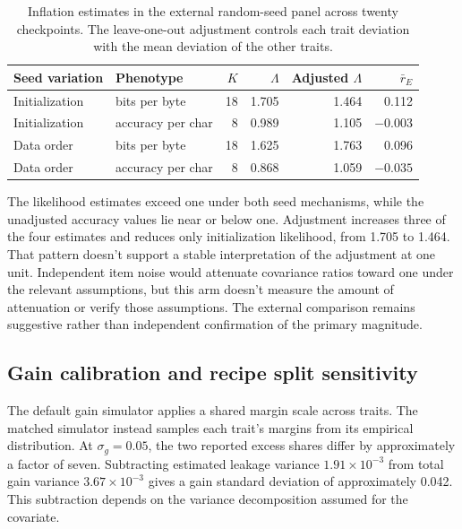 \begin{table}[htbp]
\centering\small
\caption{Inflation estimates in the external random-seed panel across twenty checkpoints. The leave-one-out adjustment controls each trait deviation with the mean deviation of the other traits.}
\label{tab:original12}
\begin{tabular}{llrrrr}\hline
Seed variation & Phenotype & $K$ & $\Lambda$ & Adjusted $\Lambda$ & $\bar r_E$\\\hline
Initialization & bits per byte & 18 & 1.705 & 1.464 & 0.112\\
Initialization & accuracy per char & 8 & 0.989 & 1.105 & $-0.003$\\
Data order & bits per byte & 18 & 1.625 & 1.763 & 0.096\\
Data order & accuracy per char & 8 & 0.868 & 1.059 & $-0.035$\\\hline
\end{tabular}
\end{table}

The likelihood estimates exceed one under both seed mechanisms, while the unadjusted accuracy values lie near or below one. Adjustment increases three of the four estimates and reduces only initialization likelihood, from 1.705 to 1.464. That pattern doesn't support a stable interpretation of the adjustment at one unit. Independent item noise would attenuate covariance ratios toward one under the relevant assumptions, but this arm doesn't measure the amount of attenuation or verify those assumptions. The external comparison remains suggestive rather than independent confirmation of the primary magnitude.

\subsection{Gain calibration and recipe split sensitivity}
The default gain simulator applies a shared margin scale across traits. The matched simulator instead samples each trait's margins from its empirical distribution. At $\sigma_g=0.05$, the two reported excess shares differ by approximately a factor of seven. Subtracting estimated leakage variance $1.91\times10^{-3}$ from total gain variance $3.67\times10^{-3}$ gives a gain standard deviation of approximately 0.042. This subtraction depends on the variance decomposition assumed for the covariate.

